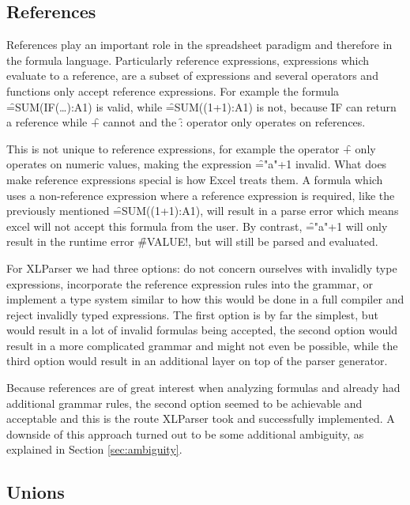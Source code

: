 \subsection{References}
\label{tradeoff:references}

References play an important role in the spreadsheet paradigm and therefore in the formula language.
Particularly reference expressions, expressions which evaluate to a reference, are a subset of expressions and several operators and functions only accept reference expressions.
For example the formula \f{=SUM(IF(\ldots):A1)} is valid, while \f{=SUM((1+1):A1)} is not, because \f{IF} can return a reference while \f{+} cannot and the \f{:} operator only operates on references.

This is not unique to reference expressions, for example the operator \f{+} only operates on numeric values, making the expression \f{="a"+1} invalid.
What does make reference expressions special is how Excel treats them.
A formula which uses a non-reference expression where a reference expression is required, like the previously mentioned \f{=SUM((1+1):A1)}, will result in a parse error which means excel will not accept this formula from the user.
By contrast, \f{="a"+1} will only result in the runtime error \f{\#VALUE!}, but will still be parsed and evaluated.

\newpage

For XLParser we had three options: do not concern ourselves with invalidly type expressions, incorporate the reference expression rules into the grammar, or implement a type system similar to how this would be done in a full compiler and reject invalidly typed expressions.
The first option is by far the simplest, but would result in a lot of invalid formulas being accepted, the second option would result in a more complicated grammar and might not even be possible, while the third option would result in an additional layer on top of the parser generator.

Because references are of great interest when analyzing formulas and already had additional grammar rules, the second option seemed to be achievable and acceptable and this is the route XLParser took and successfully implemented.
A downside of this approach turned out to be some additional ambiguity, as explained in Section \ref{sec:ambiguity}.

\subsection{Unions}
\label{subsec:desing:unions}

